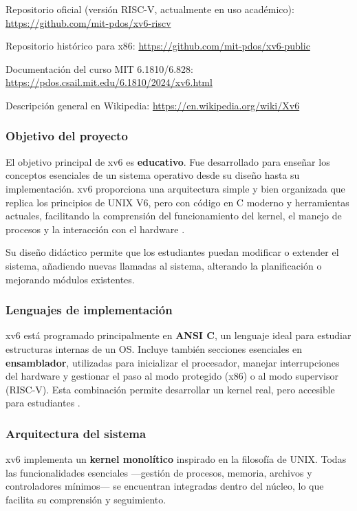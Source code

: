 Repositorio oficial (versión RISC-V, actualmente en uso académico):  
\url{https://github.com/mit-pdos/xv6-riscv}

Repositorio histórico para x86:  
\url{https://github.com/mit-pdos/xv6-public}

Documentación del curso MIT 6.1810/6.828:  
\url{https://pdos.csail.mit.edu/6.1810/2024/xv6.html}

Descripción general en Wikipedia:  
\url{https://en.wikipedia.org/wiki/Xv6}

\subsubsection{Objetivo del proyecto}

El objetivo principal de xv6 es \textbf{educativo}. Fue desarrollado para enseñar los conceptos esenciales de un sistema operativo desde su diseño hasta su implementación. xv6 proporciona una arquitectura simple y bien organizada que replica los principios de UNIX V6, pero con código en C moderno y herramientas actuales, facilitando la comprensión del funcionamiento del kernel, el manejo de procesos y la interacción con el hardware \cite{xv6_mit_about, xv6_book}.

Su diseño didáctico permite que los estudiantes puedan modificar o extender el sistema, añadiendo nuevas llamadas al sistema, alterando la planificación o mejorando módulos existentes.

\subsubsection{Lenguajes de implementación}

xv6 está programado principalmente en \textbf{ANSI C}, un lenguaje ideal para estudiar estructuras internas de un OS. Incluye también secciones esenciales en \textbf{ensamblador}, utilizadas para inicializar el procesador, manejar interrupciones del hardware y gestionar el paso al modo protegido (x86) o al modo supervisor (RISC-V). Esta combinación permite desarrollar un kernel real, pero accesible para estudiantes \cite{xv6_book}.

\subsubsection{Arquitectura del sistema}

xv6 implementa un \textbf{kernel monolítico} inspirado en la filosofía de UNIX.  
Todas las funcionalidades esenciales —gestión de procesos, memoria, archivos y controladores mínimos— se encuentran integradas dentro del núcleo, lo que facilita su comprensión y seguimiento.

